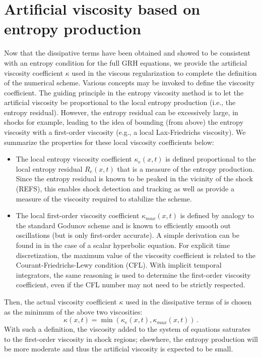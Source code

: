 \documentclass[times]{fldauth}
\begin{document}
\section{Artificial viscosity based on entropy production}
\label{sec:def-visc-coeff}
%
Now that the dissipative terms have been obtained and showed to be consistent with an entropy condition for the full GRH
equations, we provide the artificial viscosity coefficient $\kappa$ used in the viscous regularization to complete the 
definition of the numerical scheme. Various concepts may be invoked to define the viscosity coefficient. The guiding principle
in the entropy viscosity method \cite{jlg1, jlg2} is to let the artificial viscosity be proportional to the local entropy
production (i.e., the entropy residual). However, the entropy residual can be excessively large, in shocks for example, leading
to the idea of bounding (from above) the entropy viscosity with a first-order viscosity (e.g., a local Lax-Friedrichs viscosity).
We summarize the properties for these local viscosity coefficients below:
\begin{itemize}
\item The local entropy viscosity coefficient $\kappa_e(x,t)$ is defined proportional to the local entropy residual $R_e(x,t)$ that 
is a measure of the entropy production. Since the entropy residual is known to be peaked in the vicinity of the shock (REFS), 
this enables shock detection and tracking as well as provide a measure of the viscosity required to stabilize the scheme. 
\item The local first-order viscosity coefficient $\kappa_{max}(x,t)$ is defined by analogy to the standard Godunov scheme and is known to efficiently 
smooth out oscillations (but is only first-order accurate). A simple derivation can be found in \cite{jlg1} in the case of a scalar 
hyperbolic equation. For explicit time discretization, the maximum value of the viscosity coefficient is related to the 
Courant-Friedrichs-Lewy condition (CFL). With implicit temporal integrators, the same reasoning is used to determine the
first-order viscosity coefficient, even if the CFL number may not need to be strictly respected. 
\end{itemize}
%
Then, the actual viscosity coefficient $\kappa$ used in the dissipative terms of  is chosen
as the minimum of the above two viscosities:  
%
\begin{equation}
\kappa(x,t) = \min ( \kappa_e(x,t), \kappa_{max}(x,t) ) \, . 
\end{equation}
%
With such a definition, the viscosity added to the system of equations saturates to the first-order viscosity in shock regions; elsewhere, 
the entropy production will be more moderate and thus the artificial viscosity is expected to be small.
\end{document}
